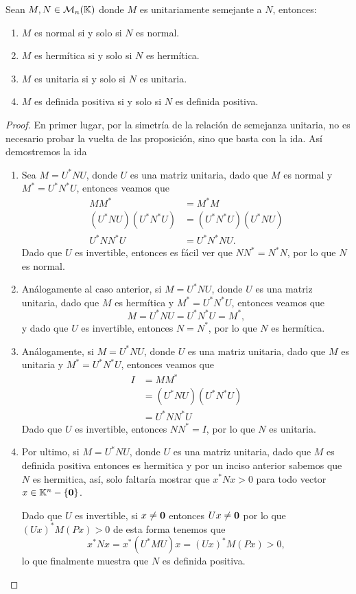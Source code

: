 \begin{teor}
  Sean $M,N \in \mathcal{M}_n(\mathbb{K})$ donde $M$ es unitariamente semejante a $N$, entonces:
  \begin{enumerate}
    \item $M$ es normal si y solo si $N$ es normal.
    \item $M$ es hermítica si y solo si $N$ es hermítica.
    \item $M$ es unitaria si y solo si $N$ es unitaria.
    \item $M$ es definida positiva si y solo si $N$ es definida positiva.
  \end{enumerate}
\end{teor}
\begin{proof}
  En primer lugar, por la simetría de la relación de semejanza unitaria, no es necesario probar la vuelta de las proposición, sino que basta con la ida. Así demostremos la ida
  \begin{enumerate}
    \item Sea $M = U^* N U$, donde $U$ es una matriz unitaria, dado que $M$ es normal y $M^* = U^* N^* U$, entonces veamos que
      \begin{align*}
        MM^* &= M^* M \\
        (U^* N U)(U^* N^* U) &= (U^* N^* U)(U^* N U) \\
        U^* N N^* U &= U^* N^* N U.
      \end{align*}
    Dado que $U$ es invertible, entonces es fácil ver que $NN^* = N^* N$, por lo que $N$ es normal.

    \item Análogamente al caso anterior, si $M = U^* N U$, donde $U$ es una matriz unitaria, dado que $M$ es hermítica y $M^* = U^* N^* U$, entonces veamos que
      \[ M =  U^* N U = U^* N^* U = M^*, \]
    y dado que $U$ es invertible, entonces $N = N^*$, por lo que $N$ es hermítica.

    \item Análogamente, si $M = U^* N U$, donde $U$ es una matriz unitaria, dado que $M$ es unitaria y $M^* = U^* N^* U$, entonces veamos que
    \begin{align*}
      I &= MM^*  \\
      &= (U^* N U)(U^* N^* U)  \\
      &= U^* N N^* U 
    \end{align*}
  Dado que $U$ es invertible, entonces $NN^* = I$, por lo que $N$ es unitaria.

  \item Por ultimo, si $M = U^* N U$, donde $U$ es una matriz unitaria, dado que $M$ es definida positiva entonces es hermitica y por un inciso anterior sabemos que $N$ es hermitica, así, solo faltaría mostrar que $x^* N x > 0$ para todo vector $x \in \mathbb{K}^n - \{\mathbf{0}\}$.
  
  Dado que $U$ es invertible, si $x \neq \mathbf{0}$ entonces $Ux \neq \mathbf{0}$ por lo que $(Ux)^* M (Px)>0$ de esta forma tenemos que
    \[x^* N x = x^* (U^* M U) x = (Ux)^* M (Px) > 0,\]
  lo que finalmente muestra que $N$ es definida positiva.
  \end{enumerate}
\end{proof}


